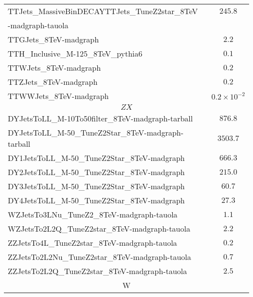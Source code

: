 \begin{table}[!Hhtb]
\begin{center}
{\begin{tabular}{|l|c|}
TTJets\_MassiveBinDECAYTTJets\_TuneZ2star\_8TeV  &  $245.8$       \\
-madgraph-tauola                                        &               \\
TTGJets\_8TeV-madgraph                                  &  $2.2$              \\%
TTH\_Inclusive\_M-125\_8TeV\_pythia6                    &  $0.1$               \\
TTWJets\_8TeV-madgraph                                  &  $0.2$              \\
TTZJets\_8TeV-madgraph                                  &  $0.2$                \\
TTWWJets\_8TeV-madgraph                                 &  $0.2\times 10^{-2}$                \\

\hline\hline
\multicolumn{2}{|c|}{$ZX$ }\\
\hline\hline
DYJetsToLL\_M-10To50filter\_8TeV-madgraph-tarball      &   $876.8$               \\
DYJetsToLL\_M-50\_TuneZ2Star\_8TeV-madgraph-tarball    &   $3503.7$               \\
DY1JetsToLL\_M-50\_TuneZ2Star\_8TeV-madgraph           &   $666.3$               \\
DY2JetsToLL\_M-50\_TuneZ2Star\_8TeV-madgraph           &   $215.0$               \\
DY3JetsToLL\_M-50\_TuneZ2Star\_8TeV-madgraph           &   $60.7$               \\
DY4JetsToLL\_M-50\_TuneZ2Star\_8TeV-madgraph           &   $27.3$               \\
WZJetsTo3LNu\_TuneZ2\_8TeV-madgraph-tauola             &  $1.1$                \\
WZJetsTo2L2Q\_TuneZ2star\_8TeV-madgraph-tauola         &  $2.2$                \\
ZZJetsTo4L\_TuneZ2star\_8TeV-madgraph-tauola           &  $0.2$                \\
ZZJetsTo2L2Nu\_TuneZ2star\_8TeV-madgraph-tauola        &  $0.7$                \\
ZZJetsTo2L2Q\_TuneZ2star\_8TeV-madgraph-tauola         &  $2.5$                \\
\hline\hline
\multicolumn{2}{|c|}{W}\\
\hline\hline


\end{tabular}}
\end{center}
\end{table}
